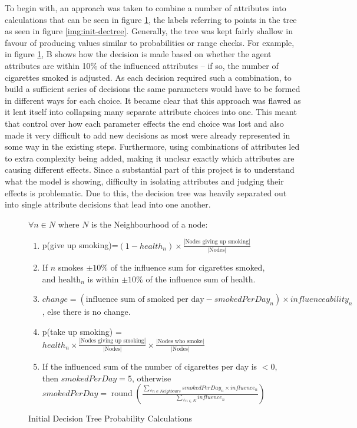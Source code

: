 \documentclass[]{report}
\begin{document}
To begin with, an approach was taken to combine a number of attributes into calculations that can be seen in figure \ref{eq:v0.9probs}, the labels referring to points in the tree as seen in figure \ref{img:init-dectree}. Generally, the tree was kept fairly shallow in favour of producing values similar to probabilities or range checks. For example, in figure \ref{eq:v0.9probs}, B shows how the decision is made based on whether the agent attributes are within 10\% of the influenced attributes – if so, the number of cigarettes smoked is adjusted. As each decision required such a combination, to build a sufficient series of decisions the same parameters would have to be formed in different ways for each choice. It became clear that this approach was flawed as it lent itself into collapsing many separate attribute choices into one. This meant that control over how each parameter effects the end choice was lost and also made it very difficult to add new decisions as most were already represented in some way in the existing steps. Furthermore, using combinations of attributes led to extra complexity being added, making it unclear exactly which attributes are causing different effects. Since a substantial part of this project is to understand what the model is showing, difficulty in isolating attributes and judging their effects is problematic. Due to this, the decision tree was heavily separated out into single attribute decisions that lead into one another.

\begin{figure}
\label{eq:v0.9probs}
	$\forall n \in N$ where $N$ is the Neighbourhood of a node:
	\begin{enumerate}
		\item p(give up smoking)=$(1-health_{n}) \times \frac{|\text{Nodes giving up smoking}|}{|\text{Nodes}|}$ \\
		\item If $n$ smokes $\pm10\%$ of the influence sum for cigarettes smoked, and $\text{health}_{n}$ is within $\pm10\%$ of the influence sum of health. \\
		\item $change = (\text{influence sum of smoked per day} - {smokedPerDay}_{n}) \times influenceability_{n}$, else there is no change. \\
		\item p(take up smoking) = $health_{n} \times \frac{|\text{Nodes giving up smoking}|}{|\text{Nodes}|} \times \frac{|\text{Nodes who smoke}|}{|\text{Nodes}|}$ \\
		\item If the influenced sum of the number of cigarettes per day is $< 0$, then $smokedPerDay = 5$, otherwise \\
		$smokedPerDay = \operatorname{round}(\frac{\sum_{\forall n \in Neighbours} smokedPerDay_{n} \times influence_{n}}{\sum_{\forall n \in N} influence_{n}})$
	\end{enumerate}
	\caption{Initial Decision Tree Probability Calculations}
\end{figure}
\end{document}
